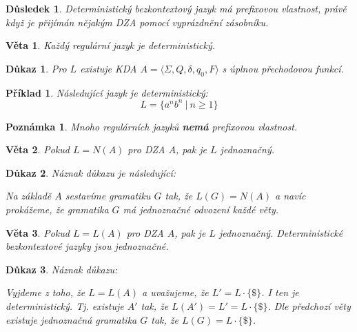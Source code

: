\documentclass[10pt, a4paper, titlepage]{article}
\theoremstyle{note}
\newtheorem{dukaz}{Důkaz}
\newtheorem{veta}{Věta}
\newtheorem{priklad}{Příklad}
\newtheorem{poznamka}{Poznámka}
\newtheorem{dusledek}{Důsledek}
\begin{document}
\begin{dusledek}
Deterministický bezkontextový jazyk má prefixovou vlastnost, právě když je přijímán nějakým DZA pomocí vyprázdnění zásobníku.
\end{dusledek}

\begin{veta}
Každý regulární jazyk je deterministický.
\end{veta}

\begin{dukaz}
Pro $L$ existuje KDA $A = \langle \Sigma,Q,\delta,q_0,F \rangle$ s úplnou přechodovou funkcí.
\end{dukaz}

\begin{priklad}
Následující jazyk je deterministický:
$$
L = \lbrace a^nb^n\ |\ n\ge1 \rbrace
$$
\end{priklad}

\begin{poznamka}
Mnoho regulárních jazyků \textbf{nemá} prefixovou vlastnost.
\end{poznamka}

\begin{veta}
Pokud $L=N(A)$ pro DZA $A$, pak je $L$ jednoznačný.
\end{veta}

\begin{dukaz}
Náznak důkazu je následující:

Na základě $A$ sestavíme gramatiku $G$ tak, že $L(G) = N(A)$ a navíc prokážeme, že gramatika $G$ má jednoznačné odvození každé věty.
\end{dukaz}

\begin{veta}
Pokud $L=L(A)$ pro DZA $A$, pak je $L$ jednoznačný. Deterministické bezkontextové jazyky jsou jednoznačné.
\end{veta}

\begin{dukaz}
Náznak důkazu:

Vyjdeme z toho, že $L=L(A)$ a uvažujeme, že $L'=L \cdot \lbrace \$ \rbrace$. I ten je deterministický. Tj. existuje $A'$ tak, že $L(A')=L'=L \cdot \lbrace \$ \rbrace$. Dle předchozí věty existuje jednoznačná gramatika $G$ tak, že $L(G) = L \cdot \lbrace \$ \rbrace$.
\end{dukaz}
\end{document}
